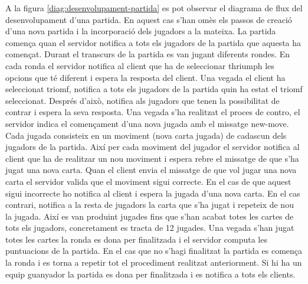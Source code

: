 A la figura \ref{diag:desenvolupament-partida} es pot observar el diagrama de flux del desenvolupament d'una partida. En aquest cas s'han omès els passos de creació d'una nova partida i la incorporació dels jugadors a la mateixa. La partida comença quan el servidor notifica a tots els jugadors de la partida que aquesta ha començat. Durant el transcurs de la partida es van jugant diferents rondes. En cada ronda el servidor notifica al client que ha de seleccionar thriumph les opcions que té diferent i espera la resposta del client. Una vegada el client ha seleccionat triomf, notifica a tots els jugadors de la partida quin ha estat el triomf seleccionat. Després d'això, notifica als jugadors que tenen la possibilitat de contrar i espera la seva resposta. Una vegada s'ha realitzat el proces de contro, el servidor indica el començament d'una nova jugada amb el missatge new-move. Cada jugada consisteix en un moviment (nova carta jugada) de cadascun dels jugadors de la partida. Així per cada moviment del jugador el servidor notifica al client que ha de realitzar un nou moviment i espera rebre el missatge de que s'ha jugat una nova carta. Quan el client envia el missatge de que vol jugar una nova carta el servidor valida que el moviment sigui correcte. En el cas de que aquest sigui incorrecte ho notifica al client i espera la jugada d'una nova carta. En el cas contrari, notifica a la resta de jugadors la carta que s'ha jugat i repeteix de nou la jugada. Així es van produint jugades fins que s'han acabat totes les cartes de tots els jugadors, concretament es tracta de 12 jugades. Una vegada s'han jugat totes les cartes la ronda es dona per finalitzada i el servidor computa les puntuacions de la partida. En el cas que no s'hagi finalitzat la partida es comença la ronda i es torna a repetir tot el procediment realitzat anteriorment. Si hi ha un equip guanyador la partida es dona per finalitzada i es notifica a tots els clients. 


